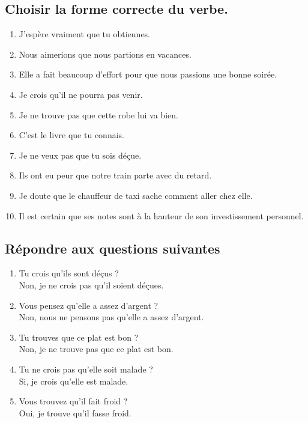 \documentclass[12pt]{article}
\begin{document}
\subsection{Choisir la forme correcte du verbe.}
\begin{enumerate}
	\item J’espère vraiment que tu obtiennes.
	\item Nous aimerions que nous partions en vacances.
	\item Elle a fait beaucoup d’effort pour que nous passions une bonne soirée.
	\item Je crois qu’il ne pourra pas venir.
	\item Je ne trouve pas que cette robe lui va bien.
	\item C’est le livre que tu connais.
	\item Je ne veux pas que tu sois déçue.
	\item Ils ont eu peur que notre train parte avec du retard.
	\item Je doute que le chauffeur de taxi sache comment aller chez elle.
	\item Il est certain que ses notes sont à la hauteur de son investissement personnel.
\end{enumerate}
\subsection{Répondre aux questions suivantes}
\begin{enumerate}
	\item Tu crois qu’ils sont déçus ? \\
	       Non, je ne crois pas qu'il soient déçues.
	\item Vous pensez qu’elle a assez d’argent ? \\
	       Non, nous ne pensons pas qu'elle a assez d'argent.
	\item Tu trouves que ce plat est bon ? \\
	       Non, je ne trouve pas que ce plat est bon.
	\item Tu ne crois pas qu’elle soit malade ? \\
	       Si, je crois qu'elle est malade.
	\item Vous trouvez qu’il fait froid ? \\
	       Oui, je trouve qu'il fasse froid.
\end{enumerate}
\end{document}
